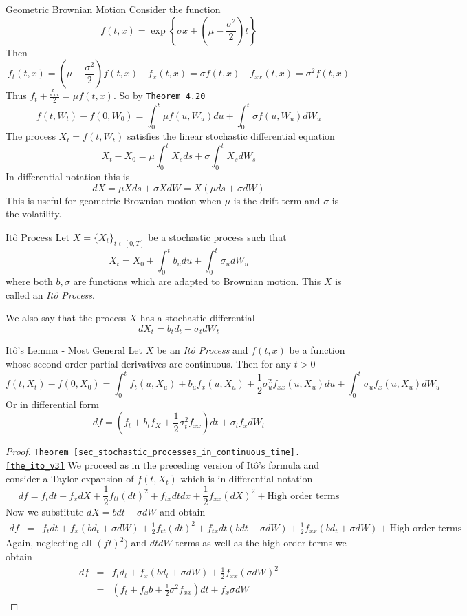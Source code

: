 \documentclass[11pt,a4paper]{article}
\begin{document}
  \begin{example}{Geometric Brownian Motion}\label{exp_geometric_brownian_motion}
    Consider the function
    \[ f(t,x)=\exp\left\{\sigma x+(\mu-\frac{\sigma^2}2)t\right\} \]
    Then
    \[ f_t(t,x)=\left(\mu-\frac{\sigma^2}2\right)f(t,x)\quad f_x(t,x)=\sigma f(t,x)\quad f_{xx}(t,x)=\sigma^2f(t,x) \]
    Thus $f_t+\frac{f_{xx}}2=\mu f(t,x)$. So by \texttt{Theorem 4.20}
    \[ f(t,W_t)-f(0,W_0)=\int_0^t\mu f(u,W_u)du+\int_0^t\sigma f(u,W_u)dW_u \]
    The process $X_t=f(t,W_t)$ satisfies the linear stochastic differential equation
    \[ X_t-X_0=\mu\int_0^tX_sds+\sigma\int_0^tX_sdW_s \]
    In differential notation this is
    \[ dX=\mu Xds+\sigma XdW=X(\mu ds+\sigma dW) \]
    This is useful for geometric Brownian motion when $\mu$ is the drift term and $\sigma$ is the volatility.
  \end{example}

  \begin{definition}{It\^o Process}
    Let $X=\{X_t\}_{t\in[0,T]}$ be a stochastic process such that
    \[ X_t=X_0+\int_0^tb_udu+\int_0^t\sigma_udW_u \]
    where both $b,\sigma$ are functions which are adapted to Brownian motion. This $X$ is called an \textit{It\^o Process}.
    \par We also say that the process $X$ has a stochastic differential
    \[ dX_t=b_td_t+\sigma_tdW_t \]
  \end{definition}

  \begin{theorem}{It\^o's Lemma - Most General}\label{the_ito_v3}
    Let $X$ be an \textit{It\^o Process} and $f(t,x)$ be a function  whose second order partial derivatives are continuous. Then for any $t>0$
    \[ f(t,X_t)-f(0,X_0)=\int_0^tf_t(u,X_u)+b_uf_x(u,X_u)+\frac12\sigma^2_uf_{xx}(u,X_u)du+\int_0^t\sigma_uf_x(u,X_u)dW_u \]
    Or in differential form
    \[ df=\left(f_t+b_tf_X+\frac12\sigma_t^2f_{xx}\right)dt+\sigma_tf_xdW_t \]
  \end{theorem}

  \begin{proof}{\texttt{Theorem \ref{sec_stochastic_processes_in_continuous_time}.\ref{the_ito_v3}}}
    We proceed as in the preceding version of It\^o's formula and consider a Taylor expansion of $f(t,X_t)$ which is in differential notation
    \[ df=f_tdt+f_xdX+\frac12f_{tt}(dt)^2+f_{tx}dtdx+\frac12f_{xx}(dX)^2+\text{High order terms} \]
    Now we substitute $dX=bdt+\sigma dW$ and obtain
    \[\begin{array}{rcl}
      df&=&f_tdt+f_x(bd_t+\sigma dW)+\frac12f_{tt}(dt)^2+f_{tx}dt(bdt+\sigma dW)+\frac12f_{xx}(bd_t+\sigma dW)+\text{High order terms}
    \end{array}\]
    Again, neglecting all $(ft)^2)$ and $dtdW$ terms as well as the high order terms we obtain
    \[\begin{array}{rcl}
      df&=&f_td_t+f_x(bd_t+\sigma dW)+\frac12f_{xx}(\sigma dW)^2\\
      &=&(f_t+f_xb+\frac12\sigma^2f_{xx})dt+f_x\sigma dW
    \end{array}\]
  \end{proof}
\end{document}
